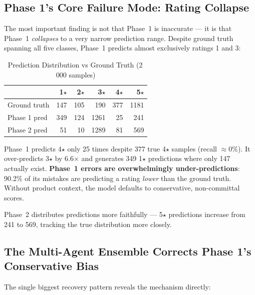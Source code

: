 \documentclass[12pt,a4paper]{article}
\begin{document}
\subsection{Phase 1's Core Failure Mode: Rating Collapse}

The most important finding is not that Phase~1 is inaccurate --- it is that Phase~1
\emph{collapses} to a very narrow prediction range. Despite ground truth spanning all five
classes, Phase~1 predicts almost exclusively ratings 1 and 3:

\begin{table}[H]
\centering
\caption{Prediction Distribution vs Ground Truth (2\,000 samples)}
\begin{tabular}{lrrrrr}
\toprule
 & \textbf{1$\star$} & \textbf{2$\star$} & \textbf{3$\star$} & \textbf{4$\star$} & \textbf{5$\star$} \\
\midrule
Ground truth & 147 & 105 & 190 & 377 & 1181 \\
Phase 1 pred & 349 &  124 & 1261 &  25 &  241 \\
Phase 2 pred &  51 &   10 & 1289 &  81 &  569 \\
\bottomrule
\end{tabular}
\end{table}

\noindent Phase~1 predicts 4$\star$ only 25 times despite 377 true 4$\star$ samples
(recall $\approx 0\%$). It over-predicts 3$\star$ by 6.6$\times$ and generates 349 1$\star$
predictions where only 147 actually exist. \textbf{Phase~1 errors are overwhelmingly
under-predictions}: 90.2\% of its mistakes are predicting a rating \emph{lower} than the
ground truth. Without product context, the model defaults to conservative, non-committal
scores.

Phase~2 distributes predictions more faithfully --- 5$\star$ predictions increase from 241
to 569, tracking the true distribution more closely.

\subsection{The Multi-Agent Ensemble Corrects Phase 1's Conservative Bias}

The single biggest recovery pattern reveals the mechanism directly:
\end{document}
